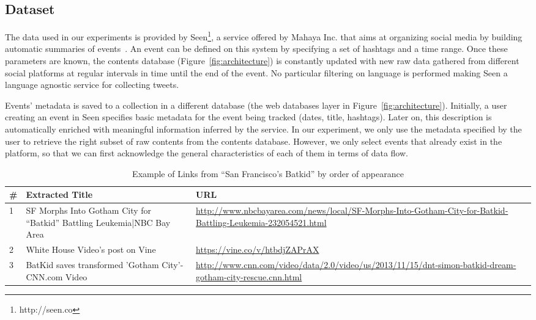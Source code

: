 \documentclass{sig-alternate-somus}
\begin{document}
\subsection{Dataset}
\label{sec:dataset}
The data used in our experiments is provided by Seen\footnote{http://seen.co}, a service offered by Mahaya Inc. that aims at organizing social media by building automatic summaries of events~\cite{SeenWired}. An event can be defined on this system by specifying a set of hashtags and a time range. Once these parameters are known, the contents database (Figure~\ref{fig:architecture}) is constantly updated with new raw data gathered from different social platforms at regular intervals in time until the end of the event. No particular filtering on language is performed making Seen a language agnostic service for collecting tweets.

Events' metadata is saved to a collection in a different database (the web databases layer in Figure~\ref{fig:architecture}). Initially, a user creating an event in Seen specifies basic metadata for the event being tracked (dates, title, hashtags). Later on, this description is automatically enriched with meaningful information inferred by the service. In our experiment, we only use the metadata specified by the user to retrieve the right subset of raw contents from the contents database. However, we only select events that already exist in the platform, so that we can first acknowledge the general characteristics of each of them in terms of data flow.

\begin{table}[htbp]
\begin{tabular}{| p{0.2cm} | p{3.5cm} | p{3.8cm} |}
  \hline
  \textbf{\#} & \textbf{Extracted Title} & \textbf{URL} \\
  \hline
  1 & SF Morphs Into Gotham City for ``Batkid'' Battling Leukemia|NBC Bay Area & \url{http://www.nbcbayarea.com/news/local/SF-Morphs-Into-Gotham-City-for-Batkid-Battling-Leukemia-232054521.html} \\
\hline
  2 &White House Video's post on Vine &\url{https://vine.co/v/htbdjZAPrAX} \\
\hline
  3 & BatKid saves transformed 'Gotham City'-CNN.com Video&\url{http://www.cnn.com/video/data/2.0/video/us/2013/11/15/dnt-simon-batkid-dream-gotham-city-rescue.cnn.html} \\
\hline
\end{tabular}
\caption{Example of Links from ``San Francisco's Batkid'' by order of appearance}
\label{tab:sfbatkid}
\end{table}
\end{document}
